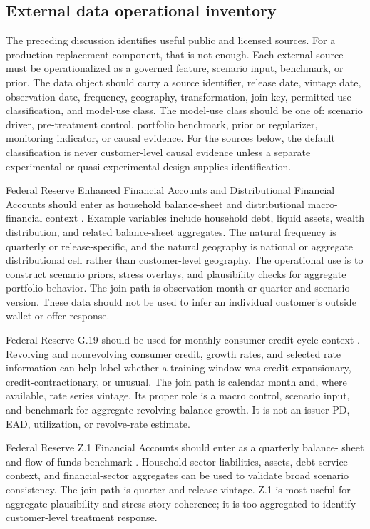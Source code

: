 \documentclass[11pt]{article}
\newcommand{\1}{\mathbf{1}}
\begin{document}
\subsection{External data operational inventory}
\label{subsec:external-data-operational-inventory}

The preceding discussion identifies useful public and licensed sources. For a
production replacement component, that is not enough. Each external source must
be operationalized as a governed feature, scenario input, benchmark, or prior.
The data object should carry a source identifier, release date, vintage date,
observation date, frequency, geography, transformation, join key, permitted-use
classification, and model-use class. The model-use class should be one of:
scenario driver, pre-treatment control, portfolio benchmark, prior or
regularizer, monitoring indicator, or causal evidence. For the sources below,
the default classification is never customer-level causal evidence unless a
separate experimental or quasi-experimental design supplies identification.

Federal Reserve Enhanced Financial Accounts and Distributional Financial
Accounts should enter as household balance-sheet and distributional
macro-financial context \citep{federalreserveEFA}. Example variables include
household debt, liquid assets, wealth distribution, and related balance-sheet
aggregates. The natural frequency is quarterly or release-specific, and the
natural geography is national or aggregate distributional cell rather than
customer-level geography. The operational use is to construct scenario priors,
stress overlays, and plausibility checks for aggregate portfolio behavior. The
join path is observation month or quarter and scenario version. These data
should not be used to infer an individual customer's outside wallet or offer
response.

Federal Reserve G.19 should be used for monthly consumer-credit cycle context
\citep{federalreserveG19}. Revolving and nonrevolving consumer credit, growth
rates, and selected rate information can help label whether a training window
was credit-expansionary, credit-contractionary, or unusual. The join path is
calendar month and, where available, rate series vintage. Its proper role is a
macro control, scenario input, and benchmark for aggregate revolving-balance
growth. It is not an issuer PD, EAD, utilization, or revolve-rate estimate.

Federal Reserve Z.1 Financial Accounts should enter as a quarterly balance-
sheet and flow-of-funds benchmark \citep{federalreserveZ1}. Household-sector
liabilities, assets, debt-service context, and financial-sector aggregates can
be used to validate broad scenario consistency. The join path is quarter and
release vintage. Z.1 is most useful for aggregate plausibility and stress
story coherence; it is too aggregated to identify customer-level treatment
response.
\end{document}
